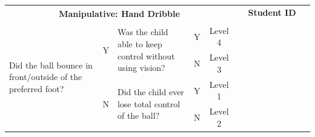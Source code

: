 \documentclass[
  letterpaper,
  DIV=11,
  numbers=noendperiod]{scrartcl}
\begin{document}
\begin{tabular}{|p{5.5cm}|c|p{5.5cm}|c|c|*{9}{p{1.07cm}|}}
\hline
\multicolumn{5}{|c|}{\multirow{2}{*}{\centering \textbf{Manipulative: Hand Dribble}}} & \multicolumn{9}{c|}{\textbf{Student ID}} \\ 
\cline{6-14}
\multicolumn{5}{|c|}{} & & & & & & & & & \\
\hline
\multirow{4}{5.5cm}{\raggedright {\footnotesize Did the ball bounce in front/outside of the preferred foot?}} 
& \multirow{2}{*}{\footnotesize Y} 
& \multirow{2}{5.5cm}{\raggedright {\footnotesize Was the child able to keep control without using vision?}} & {\footnotesize Y} & {\footnotesize Level 4} & & & & & & & & & \\
\cline{4-14}
& & & {\footnotesize N} & {\footnotesize Level 3} & & & & & & & & & \\
\cline{2-14}
& \multirow{2}{*}{\footnotesize N} & \multirow{2}{5.5cm}{\raggedright {\footnotesize Did the child ever lose total control of the ball?}} & {\footnotesize Y} & {\footnotesize Level 1} & & & & & & & & & \\
\cline{4-14}
& & & {\footnotesize N} & {\footnotesize Level 2} & & & & & & & & & \\
\hline
\end{tabular}

\vspace{.5em}
\end{document}
